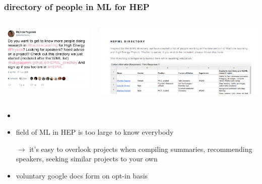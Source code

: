 \begin{frame}
  \frametitle{directory of people in ML for HEP}
  \begin{columns}
    \begin{column}{.3\textwidth}
      \includegraphics[width=.9\textwidth]{./tweet.png}
    \end{column}
    \begin{column}{.7\textwidth}
      \includegraphics[width=\textwidth]{./directory.png}
    \end{column}
  \end{columns}
  \begin{itemize}
    \item {}
    \item field of ML in HEP is too large to know everybody
    \item[$\rightarrow$] it's easy to overlook projects when compiling summaries, recommending speakers, seeking similar projects to your own
    \item voluntary google docs form on opt-in basis
  \end{itemize}
\end{frame}


